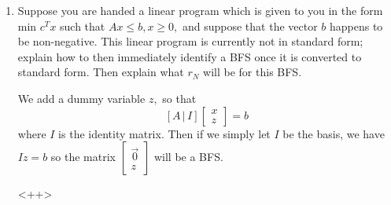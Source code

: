 \documentclass{article}
\begin{document}
\begin{enumerate}
	\item Suppose you are handed a linear program which is given to you in the form min $c^T x$ such that $Ax\le b, x\ge 0,$ and suppose that the vector $b$ happens to be non-negative. This linear program is currently not in standard form; explain how to then immediately identify a BFS once it is converted to standard form. Then explain what $r_N$ will be for this BFS.
		\begin{soln}
			We add a dummy variable $z,$ so that \[ [A\, |\, I] \begin{bmatrix}
				x \\ z
		\end{bmatrix} = b\] where $I$ is the identity matrix. Then if we simply let $I$ be the basis, we have $Iz=b$ so the matrix $\begin{bmatrix}
			\vec{0} \\ z
		\end{bmatrix}$ will be a BFS.
		\end{soln}<++>

\end{enumerate}
\end{document}
